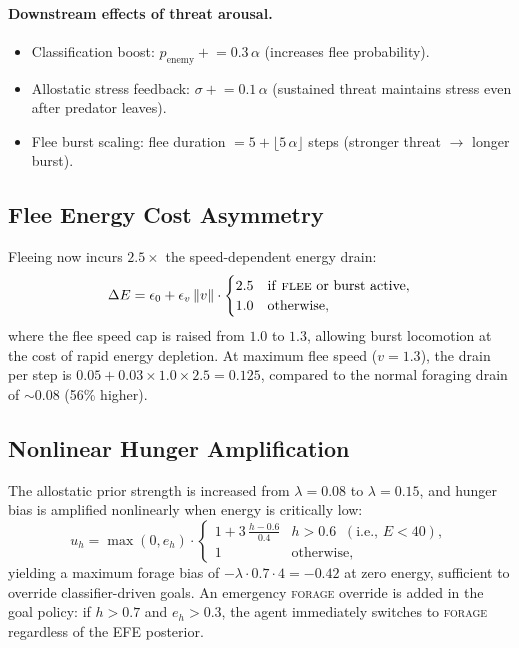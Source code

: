 \documentclass[11pt,a4paper]{article}
\begin{document}
\paragraph{Downstream effects of threat arousal.}
\begin{itemize}[nosep]
  \item Classification boost: $p_\text{enemy} \mathrel{+}= 0.3\,\alpha$
    (increases flee probability).
  \item Allostatic stress feedback: $\sigma \mathrel{+}= 0.1\,\alpha$
    (sustained threat maintains stress even after predator leaves).
  \item Flee burst scaling: flee duration
    $= 5 + \lfloor 5\,\alpha \rfloor$ steps (stronger threat $\to$ longer burst).
\end{itemize}

\subsection{Flee Energy Cost Asymmetry}

Fleeing now incurs $2.5\times$ the speed-dependent energy drain:
\begin{equation}\label{eq:flee_energy}
  \Delta E = \epsilon_0 + \epsilon_v\,\|v\| \cdot
  \begin{cases}
    2.5 & \text{if \textsc{flee} or burst active}, \\
    1.0 & \text{otherwise},
  \end{cases}
\end{equation}
where the flee speed cap is raised from $1.0$ to $1.3$, allowing burst
locomotion at the cost of rapid energy depletion.
At maximum flee speed ($v = 1.3$), the drain per step is
$0.05 + 0.03 \times 1.0 \times 2.5 = 0.125$, compared to the normal
foraging drain of ${\sim}0.08$ (56\% higher).

\subsection{Nonlinear Hunger Amplification}

The allostatic prior strength is increased from $\lambda = 0.08$ to
$\lambda = 0.15$, and hunger bias is amplified nonlinearly when energy
is critically low:
\begin{equation}\label{eq:hunger_nonlinear}
  u_h = \max(0, e_h) \cdot
  \begin{cases}
    1 + 3\,\frac{h - 0.6}{0.4} & h > 0.6 \;\;(\text{i.e., } E < 40), \\
    1 & \text{otherwise},
  \end{cases}
\end{equation}
yielding a maximum forage bias of $-\lambda \cdot 0.7 \cdot 4 = -0.42$
at zero energy, sufficient to override classifier-driven goals.
An emergency \textsc{forage} override is added in the goal policy:
if $h > 0.7$ and $e_h > 0.3$, the agent immediately switches to
\textsc{forage} regardless of the EFE posterior.
\end{document}
